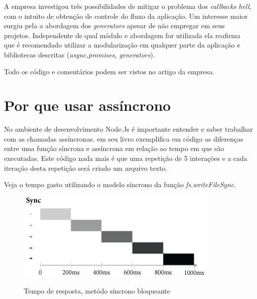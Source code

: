   A empresa \cite{Strongloop:2013} investigou três possibilidades de mitigar o problema dos \textit{callbacks hell}, com o 
  intuito de obtenção de controle do fluxo da aplicação. Um interesse maior surgiu pela a abordagem dos \textit{generators}
  apesar de não empregar em seus projetos. Independente de qual módulo e abordagem for utilizada ela reafirma que é recomendado
  utilizar a modularização em qualquer parte da aplicação e bibliotecas descritas (\textit{async,promises, generators}).
  
  Todo os código e comentários podem ser vistos no artigo da empresa. \cite{Strongloop:2013}
  
  
\section{Por que usar assíncrono}
\label{porque-usar-assincrono}

  No ambiente de desenvolvimento Node.Js é importante entender e saber trabalhar com as chamadas assíncronas. 
  \cite{Pereira:2013} em seu livro exemplifica em código as diferenças entre uma função síncrona e assíncrona 
  em relação ao tempo em que são executadas. Este código nada mais é que uma repetição de 5 interações e a cada 
  iteração desta repetição será criado um arquivo texto.
  
  Veja o tempo gasto utilizando o modelo síncrono da função \textit{fs.writeFileSync}.
  
  \begin{figure}[H]
  \setlength{\abovecaptionskip}{0pt}
  \setlength{\belowcaptionskip}{0pt}
  \caption[Tempo de resposta, metódo síncrono bloqueante]{Tempo de resposta, metódo síncrono bloqueante}
  \centering
  \includegraphics[width=.85\textwidth]{imagem/timeline-node-sync-caio-ribeiro.png}
  \captionsetup{justification=centering}
  \label{fig:timeline-sync}
  \end{figure}
  
